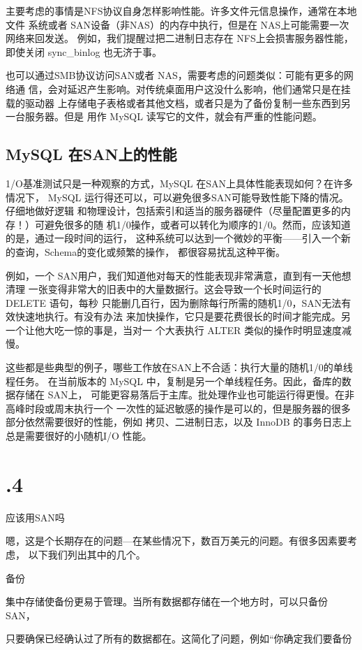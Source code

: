 主要考虑的事情是NFS协议自身怎样影响性能。许多文件元信息操作，通常在本地文件
系统或者 SAN设备（非NAS）的内存中执行，但是在 NAS上可能需要一次网络来回发送。
例如，我们提醒过把二进制日志存在 NFS上会损害服务器性能，即使关闭 sync\_binlog
也无济于事。

也可以通过SMB协议访问SAN或者 NAS，需要考虑的问题类似：可能有更多的网络通
信，会对延迟产生影响。对传统桌面用户这没什么影响，他们通常只是在挂载的驱动器
上存储电子表格或者其他文档，或者只是为了备份复制一些东西到另一台服务器。但是
用作 MySQL 读写它的文件，就会有严重的性能问题。

\subsection{MySQL 在SAN上的性能}
1/O基准测试只是一种观察的方式，MySQL 在SAN上具体性能表现如何？在许多情况下，
MySQL 运行得还可以，可以避免很多SAN可能导致性能下降的情况。仔细地做好逻辑
和物理设计，包括索引和适当的服务器硬件（尽量配置更多的内存！）可避免很多的随
机1/0操作，或者可以转化为顺序的1/0。然而，应该知道的是，通过一段时间的运行，
这种系统可以达到一个微妙的平衡——引入一个新的查询，Schema的变化或频繁的操作，
都很容易扰乱这种平衡。

例如，一个 SAN用户，我们知道他对每天的性能表现非常满意，直到有一天他想清理
一张变得非常大的旧表中的大量数据行。这会导致一个长时间运行的 DELETE 语句，每秒
只能删几百行，因为删除每行所需的随机1/0，SAN无法有效快速地执行。有没有办法
来加快操作，它只是要花费很长的时间才能完成。另一个让他大吃一惊的事是，当对一
个大表执行 ALTER 类似的操作时明显速度减慢。

这些都是些典型的例子，哪些工作放在SAN上不合适：执行大量的随机1/0的单线程任务。
在当前版本的 MySQL 中，复制是另一个单线程任务。因此，备库的数据存储在 SAN上，
可能更容易落后于主库。批处理作业也可能运行得更慢。在非高峰时段或周末执行一个
一次性的延迟敏感的操作是可以的，但是服务器的很多部分依然需要很好的性能，例如
拷贝、二进制日志，以及 InnoDB 的事务日志上总是需要很好的小随机I/O 性能。

\section{.4}
应该用SAN吗

嗯，这是个长期存在的问题—在某些情况下，数百万美元的问题。有很多因素要考虑，
以下我们列出其中的几个。

备份

集中存储使备份更易于管理。当所有数据都存储在一个地方时，可以只备份SAN，

只要确保已经确认过了所有的数据都在。这简化了问题，例如“你确定我们要备份


